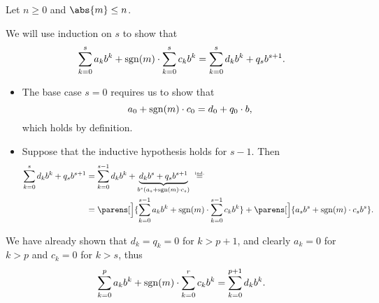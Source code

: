 \begin{defproof}
   Let \( n \geq 0 \) and \( \abs{m} \leq n \).

  We will use induction on \( s \) to show that
  \begin{equation*}
    \sum_{k=0}^s a_k b^k + \operatorname{sgn}(m) \cdot \sum_{k=0}^s c_k b^k = \sum_{k=0}^s d_k b^k + q_s b^{s+1}.
  \end{equation*}

  \begin{itemize}
    \item The base case \( s = 0 \) requires us to show that
    \begin{equation*}
      a_0 + \operatorname{sgn}(m) \cdot c_0 = d_0 + q_0 \cdot b,
    \end{equation*}
    which holds by definition.

    \item Suppose that the inductive hypothesis holds for \( s - 1 \). Then
    \begin{align*}
      \sum_{k=0}^s d_k b^k + q_s b^{s+1}
      &=
      \sum_{k=0}^{s-1} d_k b^k + \underbrace{d_k b^s + q_s b^{s+1}}_{b^s(a_s + \sgn(m) \cdot c_s)}
      \reloset{\T{ind.}} = \\ &=
      \parens[\Big]{ \sum_{k=0}^{s-1} a_k b^k + \sgn(m) \cdot \sum_{k=0}^{s-1} c_k b^k } + \parens[\Big]{ a_s b^s + \sgn(m) \cdot c_s b^s }.
    \end{align*}
  \end{itemize}

  We have already shown that \( d_k = q_k = 0 \) for \( k > p + 1 \), and clearly \( a_k = 0 \) for \( k > p \) and \( c_k = 0 \) for \( k > s \), thus
  \begin{equation*}
    \sum_{k=0}^p a_k b^k + \operatorname{sgn}(m) \cdot \sum_{k=0}^r c_k b^k = \sum_{k=0}^{p + 1} d_k b^k.
  \end{equation*}
\end{defproof}

